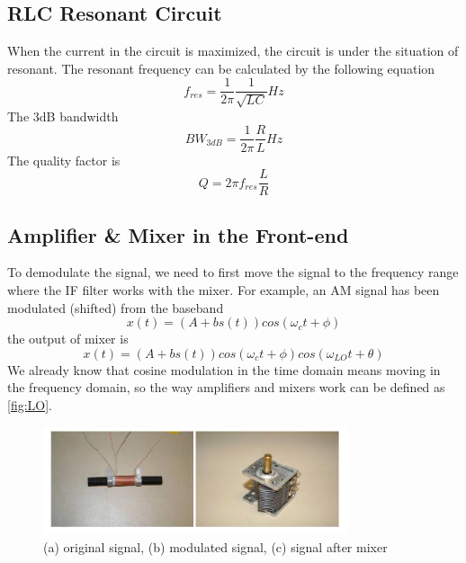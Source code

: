 \documentclass[a4paper]{article}
\begin{document}
    \subsection{RLC Resonant Circuit}
    When the current in the circuit is maximized, the circuit is under the situation of resonant. The resonant frequency can be calculated by the following equation
    \begin{equation*}
        f_{res} = \frac{1}{2\pi} \frac{1}{\sqrt{LC}}Hz
    \end{equation*}
    The 3dB bandwidth
    \begin{equation*}
        BW_{3dB} = \frac{1}{2\pi} \frac{R}{L}Hz
    \end{equation*}
    The quality factor is
    \begin{equation*}
        Q = 2\pi f_{res} \frac{L}{R}
    \end{equation*}

    \subsection{Amplifier \& Mixer in the Front-end}
    To demodulate the signal, we need to first move the signal to the frequency range where the IF filter works with the mixer. For example, an AM signal has been modulated (shifted) from the baseband
    \begin{equation*}
        x(t) = (A+bs(t))cos(\omega_ct+\phi)
    \end{equation*}
    the output of mixer is 
    \begin{equation*}
        x(t) = (A+bs(t))cos(\omega_ct+\phi)cos(\omega_{LO}t+\theta)
    \end{equation*}
    We already know that cosine modulation in the time domain means moving in the frequency domain, so the way amplifiers and mixers work can be defined as \autoref{fig:LO}.
    \begin{figure}[h]
        \centering
        \includegraphics[width=0.8\textwidth, trim={0 0 0 0cm}, clip]{loop.png}
        \caption{(a) original signal, (b) modulated signal, (c) signal after mixer}
        \label{fig:LO}
    \end{figure}
\end{document}
